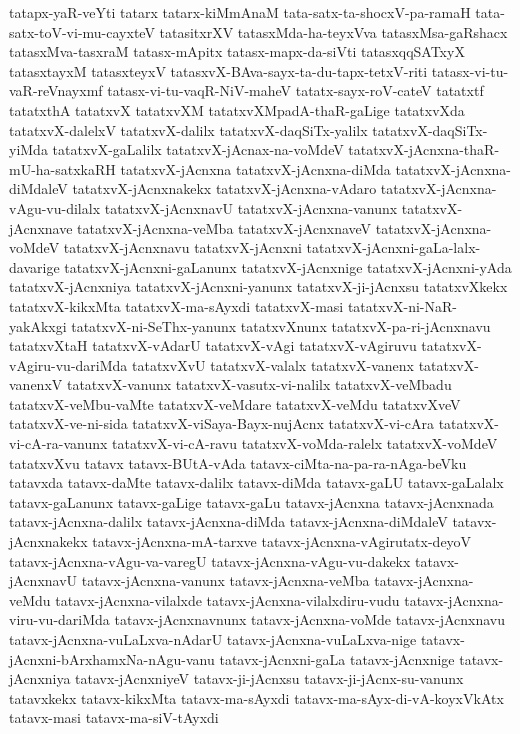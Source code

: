 {tatapx-yaR-veYti
tatarx
tatarx-kiMmAnaM
tata-satx-ta-shocxV-pa-ramaH
tata-satx-toV-vi-mu-cayxteV
tatasitxrXV
tatasxMda-ha-teyxVva
tatasxMsa-gaRshacx
tatasxMva-tasxraM
tatasx-mApitx
tatasx-mapx-da-siVti
tatasxqqSATxyX
tatasxtayxM
tatasxteyxV
tatasxvX-BAva-sayx-ta-du-tapx-tetxV-riti
tatasx-vi-tu-vaR-reVnayxmf
tatasx-vi-tu-vaqR-NiV-maheV
tatatx-sayx-roV-cateV
tatatxtf
tatatxthA
tatatxvX
tatatxvXM
tatatxvXMpadA-thaR-gaLige
tatatxvXda
tatatxvX-dalelxV
tatatxvX-dalilx
tatatxvX-daqSiTx-yalilx
tatatxvX-daqSiTx-yiMda
tatatxvX-gaLalilx
tatatxvX-jAcnax-na-voMdeV
tatatxvX-jAcnxna-thaR-mU-ha-satxkaRH
tatatxvX-jAcnxna
tatatxvX-jAcnxna-diMda
tatatxvX-jAcnxna-diMdaleV
tatatxvX-jAcnxnakekx
tatatxvX-jAcnxna-vAdaro
tatatxvX-jAcnxna-vAgu-vu-dilalx
tatatxvX-jAcnxnavU
tatatxvX-jAcnxna-vanunx
tatatxvX-jAcnxnave
tatatxvX-jAcnxna-veMba
tatatxvX-jAcnxnaveV
tatatxvX-jAcnxna-voMdeV
tatatxvX-jAcnxnavu
tatatxvX-jAcnxni
tatatxvX-jAcnxni-gaLa-lalx-davarige
tatatxvX-jAcnxni-gaLanunx
tatatxvX-jAcnxnige
tatatxvX-jAcnxni-yAda
tatatxvX-jAcnxniya
tatatxvX-jAcnxni-yanunx
tatatxvX-ji-jAcnxsu
tatatxvXkekx
tatatxvX-kikxMta
tatatxvX-ma-sAyxdi
tatatxvX-masi
tatatxvX-ni-NaR-yakAkxgi
tatatxvX-ni-SeThx-yanunx
tatatxvXnunx
tatatxvX-pa-ri-jAcnxnavu
tatatxvXtaH
tatatxvX-vAdarU
tatatxvX-vAgi
tatatxvX-vAgiruvu
tatatxvX-vAgiru-vu-dariMda
tatatxvXvU
tatatxvX-valalx
tatatxvX-vanenx
tatatxvX-vanenxV
tatatxvX-vanunx
tatatxvX-vasutx-vi-nalilx
tatatxvX-veMbadu
tatatxvX-veMbu-vaMte
tatatxvX-veMdare
tatatxvX-veMdu
tatatxvXveV
tatatxvX-ve-ni-sida
tatatxvX-viSaya-Bayx-nujAcnx
tatatxvX-vi-cAra
tatatxvX-vi-cA-ra-vanunx
tatatxvX-vi-cA-ravu
tatatxvX-voMda-ralelx
tatatxvX-voMdeV
tatatxvXvu
tatavx
tatavx-BUtA-vAda
tatavx-ciMta-na-pa-ra-nAga-beVku
tatavxda
tatavx-daMte
tatavx-dalilx
tatavx-diMda
tatavx-gaLU
tatavx-gaLalalx
tatavx-gaLanunx
tatavx-gaLige
tatavx-gaLu
tatavx-jAcnxna
tatavx-jAcnxnada
tatavx-jAcnxna-dalilx
tatavx-jAcnxna-diMda
tatavx-jAcnxna-diMdaleV
tatavx-jAcnxnakekx
tatavx-jAcnxna-mA-tarxve
tatavx-jAcnxna-vAgirutatx-deyoV
tatavx-jAcnxna-vAgu-va-varegU
tatavx-jAcnxna-vAgu-vu-dakekx
tatavx-jAcnxnavU
tatavx-jAcnxna-vanunx
tatavx-jAcnxna-veMba
tatavx-jAcnxna-veMdu
tatavx-jAcnxna-vilalxde
tatavx-jAcnxna-vilalxdiru-vudu
tatavx-jAcnxna-viru-vu-dariMda
tatavx-jAcnxnavnunx
tatavx-jAcnxna-voMde
tatavx-jAcnxnavu
tatavx-jAcnxna-vuLaLxva-nAdarU
tatavx-jAcnxna-vuLaLxva-nige
tatavx-jAcnxni-bArxhamxNa-nAgu-vanu
tatavx-jAcnxni-gaLa
tatavx-jAcnxnige
tatavx-jAcnxniya
tatavx-jAcnxniyeV
tatavx-ji-jAcnxsu
tatavx-ji-jAcnx-su-vanunx
tatavxkekx
tatavx-kikxMta
tatavx-ma-sAyxdi
tatavx-ma-sAyx-di-vA-koyxVkAtx
tatavx-masi
tatavx-ma-siV-tAyxdi
}

